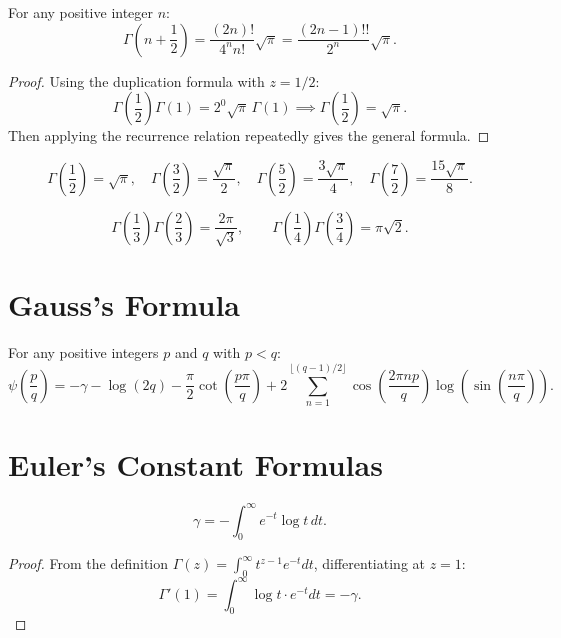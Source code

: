 \begin{theorem}
For any positive integer $n$:
\[
\Gamma\left(n + \frac{1}{2}\right) = \frac{(2n)!}{4^n n!} \sqrt{\pi} = \frac{(2n-1)!!}{2^n} \sqrt{\pi}.
\]
\end{theorem}

\begin{proof}
Using the duplication formula with $z = 1/2$:
\[
\Gamma\left(\frac{1}{2}\right)\Gamma(1) = 2^{0}\sqrt{\pi}\,\Gamma(1) \implies \Gamma\left(\frac{1}{2}\right) = \sqrt{\pi}.
\]
Then applying the recurrence relation repeatedly gives the general formula.
\end{proof}

\begin{corollary}
\[
\Gamma\left(\frac{1}{2}\right) = \sqrt{\pi}, \quad \Gamma\left(\frac{3}{2}\right) = \frac{\sqrt{\pi}}{2}, \quad \Gamma\left(\frac{5}{2}\right) = \frac{3\sqrt{\pi}}{4}, \quad \Gamma\left(\frac{7}{2}\right) = \frac{15\sqrt{\pi}}{8}.
\]
\end{corollary}

\begin{theorem}
\[
\Gamma\left(\frac{1}{3}\right)\Gamma\left(\frac{2}{3}\right) = \frac{2\pi}{\sqrt{3}}, \qquad \Gamma\left(\frac{1}{4}\right)\Gamma\left(\frac{3}{4}\right) = \pi\sqrt{2}.
\]
\end{theorem}

\section{Gauss's Formula}

\begin{theorem}
For any positive integers $p$ and $q$ with $p < q$:
\[
\psi\left(\frac{p}{q}\right) = -\gamma - \log(2q) - \frac{\pi}{2}\cot\left(\frac{p\pi}{q}\right) + 2\sum_{n=1}^{\lfloor(q-1)/2\rfloor} \cos\left(\frac{2\pi np}{q}\right)\log\left(\sin\left(\frac{n\pi}{q}\right)\right).
\]
\end{theorem}

\section{Euler's Constant Formulas}

\begin{theorem}
\[
\gamma = -\int_0^\infty e^{-t}\log t\, dt.
\]
\end{theorem}

\begin{proof}
From the definition $\Gamma(z) = \int_0^\infty t^{z-1} e^{-t} dt$, differentiating at $z = 1$:
\[
\Gamma'(1) = \int_0^\infty \log t \cdot e^{-t} dt = -\gamma.
\]
\end{proof}

